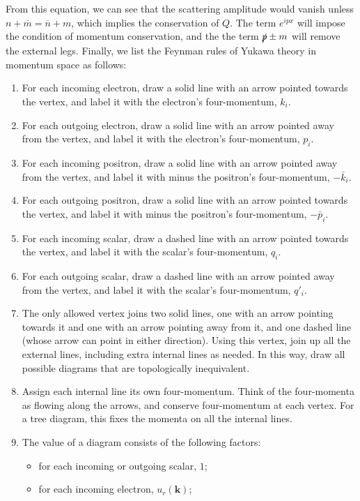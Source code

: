 \noindent
From this equation, we can see that the scattering amplitude would vanish unless $n+\overline{m} = \overline{n} + m$, which implies the conservation of $Q$. The term $e^{ipx}$ will impose the condition of momentum conservation, and the the term $\slashed{p}\pm m$ will remove the external legs.
Finally, we list the Feynman rules of Yukawa theory in momentum space as follows:
\begin{enumerate}
\item For each incoming electron, draw a solid line with an arrow pointed towards the vertex, and label it with the electron's four-momentum, $k_i$.
\item For each outgoing electron, draw a solid line with an arrow pointed away from the vertex, and label it with the electron's four-momentum, $p_i$.
\item For each incoming positron, draw a solid line with an arrow pointed away from the vertex, and label it with minus the positron's four-momentum, $-\bar{k}_i$.
\item For each outgoing positron, draw a solid line with an arrow pointed towards the vertex, and label it with minus the positron's four-momentum, $-\bar{p}_i$.
\item For each incoming scalar, draw a dashed line with an arrow pointed towards the vertex, and label it with the scalar's four-momentum, $q_i$.
\item For each outgoing scalar, draw a dashed line with an arrow pointed away from the vertex, and label it with the scalar's four-momentum, $q'_i$.
\item The only allowed vertex joins two solid lines, one with an arrow pointing towards it and one with an arrow pointing away from it, and one dashed line (whose arrow can point in either direction). Using this vertex, join up all the external lines, including extra internal lines as needed. In this way, draw all possible diagrams that are topologically inequivalent.
\item Assign each internal line its own four-momentum. Think of the four-momenta as flowing along the arrows, and conserve four-momentum at each vertex. For a tree diagram, this fixes the momenta on all the internal lines.
\item The value of a diagram consists of the following factors:
\begin{itemize}
\item for each incoming or outgoing scalar, $1$;
\item for each incoming electron, $u_{r}(\bm{k})$;

\end{itemize}
\end{enumerate}
